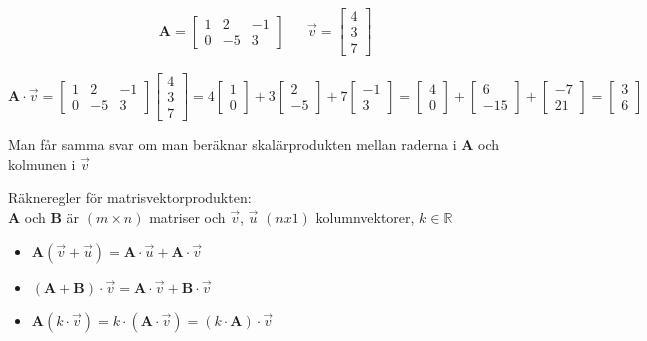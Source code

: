 \begin{Ex}
    \begin{align*}
    &\mathbf{A} = \begin{bmatrix} 1&2&-1\\0&-5&3 \end{bmatrix} &&\vec{v} = \begin{bmatrix} 4\\3\\7 \end{bmatrix}
    \end{align*}

    \[
        \mathbf{A} \cdot \vec{v} = \begin{bmatrix} 1&2&-1\\0&-5&3 \end{bmatrix} \begin{bmatrix} 4\\3\\7 \end{bmatrix} = 4 \begin{bmatrix} 1\\0 \end{bmatrix} + 3 \begin{bmatrix} 2\\-5 \end{bmatrix} + 7 \begin{bmatrix} -1\\3 \end{bmatrix} = \begin{bmatrix} 4\\0 \end{bmatrix} + \begin{bmatrix} 6\\-15 \end{bmatrix} + \begin{bmatrix} -7\\21 \end{bmatrix} = \begin{bmatrix} 3\\6 \end{bmatrix}
    \]
\end{Ex}
\begin{Rem}
    Man får samma svar om man beräknar skalärprodukten mellan raderna i \textbf{A} och kolmunen i $\vec{v}$
\end{Rem}
Räkneregler för matrisvektorprodukten:\\
\textbf{A} och \textbf{B} är $(m \times n)$ matriser och $\vec{v}$, $\vec{u}$ $(nx1)$ kolumnvektorer, $k \in \mathbb{R}$
\begin{itemize}
	\item $\mathbf{A}(\vec{v} + \vec{u}) = \mathbf{A} \cdot \vec{u} + \mathbf{A} \cdot \vec{v}$
	\item $(\mathbf{A} + \mathbf{B}) \cdot \vec{v} = \mathbf{A} \cdot \vec{v} + \mathbf{B} \cdot \vec{v}$
	\item $\mathbf{A}(k \cdot \vec{v}) = k \cdot (\mathbf{A} \cdot \vec{v}) = (k \cdot \mathbf{A}) \cdot \vec{v}$
\end{itemize}

